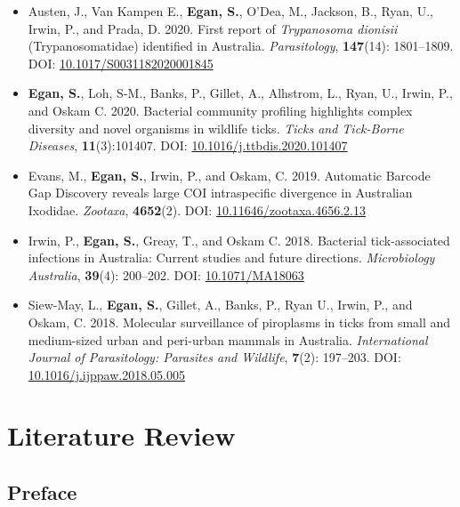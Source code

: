 \documentclass[a4paper, nobind]{templates/ociamthesis}
\renewcommand{\chaptermark}[1]{\markboth{\thechapter. #1}{\thechapter. #1}}
\begin{document}
\begin{itemize}
\item
  Austen, J., Van Kampen E., \textbf{Egan, S.}, O'Dea, M., Jackson, B., Ryan, U., Irwin, P., and Prada, D. 2020. First report of \emph{Trypanosoma dionisii} (Trypanosomatidae) identified in Australia. \emph{Parasitology}, \textbf{147}(14): 1801--1809. DOI: \href{https://doi.org/10.1017/S0031182020001845}{10.1017/S0031182020001845}
\item
  \textbf{Egan, S.}, Loh, S-M., Banks, P., Gillet, A., Alhstrom, L., Ryan, U., Irwin, P., and Oskam C. 2020. Bacterial community profiling highlights complex diversity and novel organisms in wildlife ticks. \emph{Ticks and Tick-Borne Diseases}, \textbf{11}(3):101407. DOI: \href{https://doi.org/10.1016/j.ttbdis.2020.101407}{10.1016/j.ttbdis.2020.101407}
\item
  Evans, M., \textbf{Egan, S.}, Irwin, P., and Oskam, C. 2019. Automatic Barcode Gap Discovery reveals large COI intraspecific divergence in Australian Ixodidae. \emph{Zootaxa}, \textbf{4652}(2). DOI: \href{https://doi.org/10.11646/zootaxa.4656.2.13}{10.11646/zootaxa.4656.2.13}
\item
  Irwin, P., \textbf{Egan, S.}, Greay, T., and Oskam C. 2018. Bacterial tick-associated infections in Australia: Current studies and future directions. \emph{Microbiology Australia}, \textbf{39}(4): 200--202. DOI: \href{https://doi.org/10.1071/MA18063}{10.1071/MA18063}
\item
  Siew-May, L., \textbf{Egan, S.}, Gillet, A., Banks, P., Ryan U., Irwin, P., and Oskam, C. 2018. Molecular surveillance of piroplasms in ticks from small and medium-sized urban and peri-urban mammals in Australia. \emph{International Journal of Parasitology: Parasites and Wildlife}, \textbf{7}(2): 197--203. DOI: \href{https://doi.org/10.1016/j.ijppaw.2018.05.005}{10.1016/j.ijppaw.2018.05.005}
\end{itemize}

\textcite{lohIdentificationTheileriaFuliginosalike2018}
\textcite{cooperDetectionCoxiellaBurnetii2013}

\hypertarget{litrev}{%
\chapter{Literature Review}\label{litrev}}

\chaptermark{Review}

\minitoc 

\hypertarget{preface}{%
\section*{Preface}\label{preface}}
\end{document}
